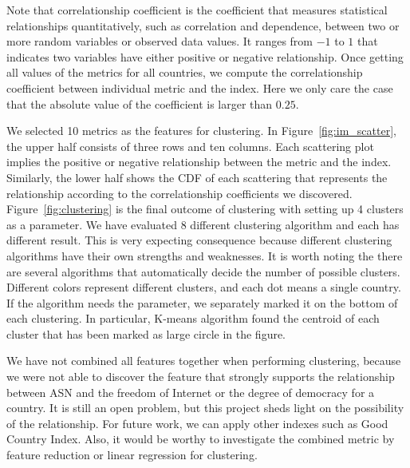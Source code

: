 \documentclass{article}
\begin{document}
\bigskip

\noindent
Note that correlationship coefficient is the coefficient that measures
statistical relationships quantitatively, such as correlation and dependence,
between two or more random variables or observed data values. It ranges from
$-1$ to $1$ that indicates two variables have either positive or negative
relationship. Once getting all values of the metrics for all countries, we
compute the correlationship coefficient between individual metric and the index.
Here we only care the case that the absolute value of the coefficient is larger than
$0.25$.

\bigskip

\noindent
We selected 10 metrics as the features for clustering. In Figure~\ref{fig:im_scatter},
the upper half consists of three rows and ten columns. Each scattering plot implies the 
positive or negative relationship between the metric and the index. Similarly, the lower 
half shows the CDF of each scattering that represents the relationship according to
the correlationship coefficients we discovered. Figure~\ref{fig:clustering} is the final
outcome of clustering with setting up 4 clusters as a parameter. We have evaluated
8 different clustering algorithm and each has different result. This is very expecting 
consequence because different clustering algorithms have their own strengths and
weaknesses. It is worth noting the there are several algorithms that automatically decide
the number of possible clusters. Different colors represent different clusters,
and each dot means a single country. If the algorithm needs the parameter, we separately
marked it on the bottom of each clustering. 
In particular, K-means algorithm found the centroid of each cluster that has been marked
as large circle in the figure.

\bigskip

\noindent
We have not combined all features together when performing clustering, because we were
not able to discover the feature that strongly supports the relationship between ASN and 
the freedom of Internet or the degree of democracy for a country. It is still an open problem,
but this project sheds light on the possibility of the relationship. For future work,
we can apply other indexes such as Good Country Index. Also, it would be worthy to 
investigate the combined metric by feature reduction or linear regression for clustering.
\end{document}
